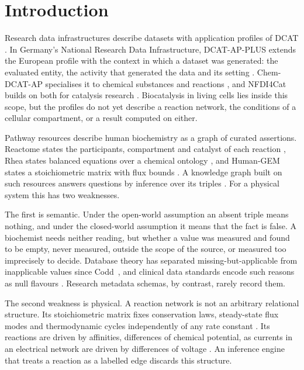 \documentclass[5p]{elsarticle}
\theoremstyle{definition}
\theoremstyle{plain}
\begin{document}
\section{Introduction}
\label{sec:intro}

Research data infrastructures describe datasets with application profiles of DCAT \citep{w3c2024dcat,semic2024dcatap}.
In Germany's National Research Data Infrastructure, DCAT-AP-PLUS extends the European profile with the context in which a dataset was generated: the evaluated entity, the activity that generated the data and its setting \citep{linke2025dcatapplus}.
Chem-DCAT-AP specialises it to chemical substances and reactions \citep{linke2025chemdcatap}, and NFDI4Cat builds on both for catalysis research \citep{wulf2021nfdi4cat}.
Biocatalysis in living cells lies inside this scope, but the profiles do not yet describe a reaction network, the conditions of a cellular compartment, or a result computed on either.

Pathway resources describe human biochemistry as a graph of curated assertions.
Reactome states the participants, compartment and catalyst of each reaction \citep{gillespie2022reactome}, Rhea states balanced equations over a chemical ontology \citep{bansal2022rhea}, and Human-GEM states a stoichiometric matrix with flux bounds \citep{robinson2020humangem}.
A knowledge graph built on such resources answers questions by inference over its triples \citep{hogan2021knowledge}.
For a physical system this has two weaknesses.

The first is semantic.
Under the open-world assumption an absent triple means nothing, and under the closed-world assumption it means that the fact is false.
A biochemist needs neither reading, but whether a value was measured and found to be empty, never measured, outside the scope of the source, or measured too imprecisely to decide.
Database theory has separated missing-but-applicable from inapplicable values since Codd~\citep{codd1986missing}, and clinical data standards encode such reasons as null flavours \citep{iso21090}.
Research metadata schemas, by contrast, rarely record them.

The second weakness is physical.
A reaction network is not an arbitrary relational structure.
Its stoichiometric matrix fixes conservation laws, steady-state flux modes and thermodynamic cycles independently of any rate constant \citep{feinberg2019foundations,schuster1994efm}.
Its reactions are driven by affinities, differences of chemical potential, as currents in an electrical network are driven by differences of voltage \citep{oster1971network,schnakenberg1976network}.
An inference engine that treats a reaction as a labelled edge discards this structure.
\end{document}
